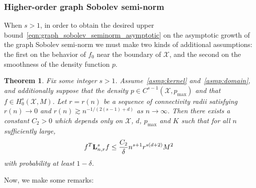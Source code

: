 \documentclass{article}
\newcommand{\1}{\mathbf{1}}
\newcommand{\Lap}{{\bf L}}
\newcommand{\Xset}{\mathcal{X}}
\theoremstyle{alden}
\theoremstyle{aldenthm}
\newtheorem{theorem}{Theorem}
\theoremstyle{definition}
\theoremstyle{remark}
\begin{document}
\subsubsection{Higher-order graph Sobolev semi-norm}
\label{subsec:higher_order_graph_sobolev_seminorm}
When $s > 1$, in order to obtain the desired upper bound~\eqref{eqn:graph_sobolev_seminorm_asymptotic} on the asymptotic growth of the graph Sobolev semi-norm we must make two kinds of additional assumptions: the first on the behavior of $f_0$ near the boundary of $\Xset$, and the second on the smoothness of the density function $p$.
\begin{theorem}
	\label{thm:graph_sobolev_seminorm}
	Fix some integer $s > 1$. Assume~\ref{asmp:kernel} and~\ref{asmp:domain}, and additionally suppose that the density $p \in C^{s - 1}(\Xset,p_{\max})$ and that $f \in H_0^s(\Xset,M)$. Let $r = r(n)$ be a sequence of connectivity radii satisfying $r(n) \to 0$ and $r(n) \gtrsim n^{-1/(2(s - 1) +d)}$ as $n \to \infty$. Then there exists a constant $C_2 > 0$ which depends only on $\Xset$, $d$, $p_{\max}$ and $K$ such that for all $n$ sufficiently large,
	\begin{equation}
	\label{eqn:graph_sobolev_seminorm}
	f^T \Lap_{n,r}^s f \leq \frac{C_2}{\delta} n^{s + 1} r^{s(d + 2)}M^2
	\end{equation}
	with probability at least $1 - \delta$.
\end{theorem}
Now, we make some remarks:
\end{document}
